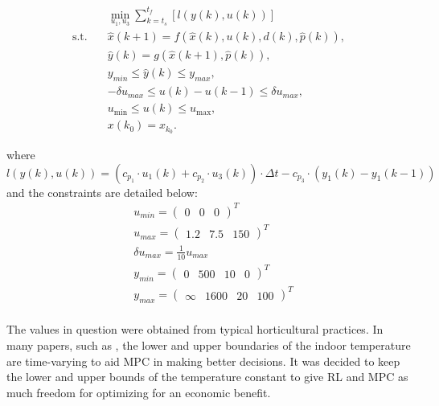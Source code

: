 \begin{subequations} \label{eq:optimisation-goal}
	\begin{align}
		& \min_{u_1,u_3} \sum_{k = t_s}^{t_f} \left[ l(y(k),u(k)) \right] \label{eq:stage-cost-epi} \\
		\text{s.t.} \quad 
		& \hat{x}(k+1) = f(\hat{x}(k), u(k), d(k), \hat{p}(k)), \label{eq:constraint-1} \\
		& \hat{y}(k) = g(\hat{x}(k+1), \hat{p}(k)), \label{eq:constraint-dynamics} \\
		& y_{min} \leq \hat{y}(k) \leq y_{max}, \label{eq:constraint-1} \\
		& -\delta u_{max} \leq u(k) - u(k-1) \leq \delta u_{max}, \label{eq:constraint-delta-u} \\
		& u_{\min} \leq u(k) \leq u_{\max}, \label{eq:constraint-u-limits} \\
		& x(k_0) = x_{k_0}. \label{eq:constraint-initial}
	\end{align}
\end{subequations}

where 
\begin{equation}\label{eq:stage_cost}
	l(y(k),u(k)) = (c_{p_1} \cdot u_1(k) + c_{p_2} \cdot u_3(k)) \cdot \Delta t  - c_{p_3} \cdot (y_1(k) - y_1(k-1))
\end{equation}
and the constraints are detailed below:
\begin{equation}\label{eq:constraints}
	\begin{aligned}
		&u_{min} = \begin{pmatrix}
			0&0&0
		\end{pmatrix}^T \\
		&u_{max} = \begin{pmatrix}
			1.2&7.5&150
		\end{pmatrix}^T	\\
		& \delta u_{max} = \frac{1}{10} u_{max}\\
		&y_{min} = \begin{pmatrix}
			0&500&10&0
		\end{pmatrix}^T \\
		&y_{max} = \begin{pmatrix}
			\infty&1600&20&100
		\end{pmatrix}^T	\\
	\end{aligned}
\end{equation}

The values in question were obtained from typical horticultural practices. In many papers, such as \citet{boersmaRobustSamplebasedModel2022}, the lower and upper boundaries of the indoor temperature are time-varying to aid MPC in making better decisions. It was decided to keep the lower and upper bounds of the temperature constant to give RL and MPC as much freedom for optimizing for an economic benefit.

